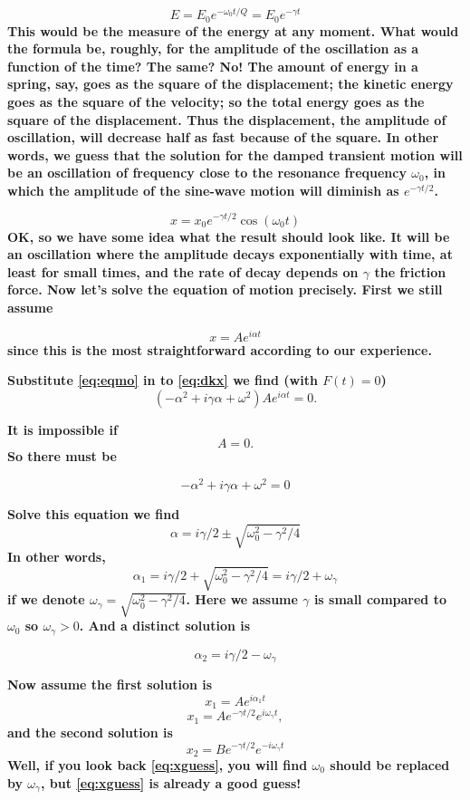 \documentclass[]{revtex4}
\newcommand{\st}[1]{{\color{red}\bfseries #1}}
\begin{document}
\[E=E_0e^{-\omega_0 t/Q}=E_0e^{-\gamma t}\]
\st{
This would be the measure of the energy at any moment. What would the formula be, roughly, for the amplitude of the oscillation as a function of the time? The same? No! The amount of energy in a spring, say, goes as the square of the displacement; the kinetic energy goes as the square of the velocity; so the total energy goes as the square of the displacement. Thus the displacement, the amplitude of oscillation, will decrease half as fast because of the square. In other words, we guess that the solution for the damped transient motion will be an oscillation of frequency close to the resonance frequency $\omega_0$,
in which the amplitude of the sine-wave motion will diminish as $e^{- \gamma t/2}$.
}

\[x=x_0e^{-\gamma t/2}\cos(\omega_0 t)\label{eq:xguess}\]
\st{OK, so we have some idea what the result should look like. It will be an oscillation where the amplitude decays
exponentially with time, at least for small times, and the rate of decay depends on $\gamma$ the friction force.
Now let's solve the equation of motion precisely. First we still assume
}

\[x = Ae^{i\alpha t}\label{eq:eqmo}\]
\st{
since this is the most straightforward according to our experience.
}

\st{
Substitute \eqref{eq:eqmo} in to \eqref{eq:dkx} we find (with $F(t)=0$)
}
\[(-\alpha^2+i\gamma \alpha +\omega^2)Ae^{i\alpha t}=0.\]

\st{
It is impossible if
}
\[A=0.\]
\st{
So there must be
}

\[-\alpha^2+i\gamma \alpha +\omega^2=0\]

\st{
  Solve this equation we find
}
\[\alpha = i\gamma/2 \pm \sqrt{\omega_0^2-\gamma^2/4}\]
\st{
In other words,
}
\[\alpha_1 = i\gamma/2+\sqrt{\omega_0^2-\gamma^2/4}=i\gamma/2+\omega_\gamma\]
\st{
if we denote $\omega_\gamma = \sqrt{\omega_0^2-\gamma^2/4}$. 
Here we assume $\gamma$ is small compared to $\omega_0$ so $\omega_\gamma > 0$.
And a distinct solution is
}

\[\alpha_2 = i\gamma/2-\omega_\gamma\]

\st{
Now assume the first solution is
}
\[x_1 = Ae^{i\alpha_1 t}\]
\[x_1 = Ae^{-\gamma t/2}e^{i\omega_\gamma t},\]
\st{
and the second solution is
}
\[x_2 = Be^{-\gamma t/2}e^{-i\omega_\gamma t}\]
\st{
Well, if you look back \eqref{eq:xguess}, you will find $\omega_0$ should be replaced
by $\omega_\gamma$, but \eqref{eq:xguess} is already a good guess!
}
\end{document}
